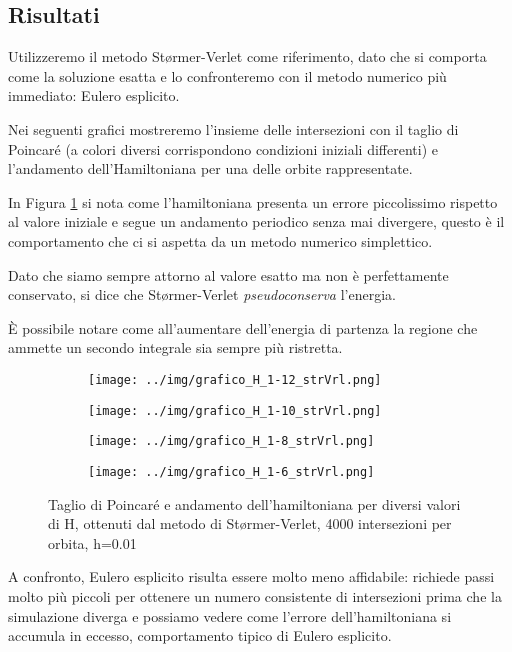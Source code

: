\documentclass[a4paper]{article}
\numberwithin{equation}{section}
\numberwithin{figure}{section}
\begin{document}
\subsection{Risultati}
Utilizzeremo il metodo Størmer-Verlet come riferimento, dato che si comporta come la soluzione
esatta\cite{hairer} e lo confronteremo con il metodo numerico più immediato: Eulero esplicito.

Nei seguenti grafici mostreremo l'insieme delle intersezioni con il taglio di Poincaré (a colori
diversi corrispondono condizioni iniziali differenti) e l'andamento dell'Hamiltoniana per una delle
orbite rappresentate.

In Figura \ref{img:stormerverlet} si nota come l'hamiltoniana presenta un errore piccolissimo rispetto
al valore iniziale e segue un andamento periodico senza mai divergere, questo è il comportamento che 
ci si aspetta da un metodo numerico simplettico.

Dato che siamo sempre attorno al valore esatto ma non è perfettamente conservato, si dice che
Størmer-Verlet \textit{pseudoconserva} l'energia.

È possibile notare come all'aumentare dell'energia di partenza la regione che ammette un secondo
integrale sia sempre più ristretta.
\clearpage
\begin{figure}[h!]
	\centering
	\begin{subfigure}[t]{.49\textwidth}
		\centering
		\texttt{[image: ../img/grafico\_H\_1-12\_strVrl.png]}
	\end{subfigure}
	\begin{subfigure}[t]{.49\textwidth}
		\centering
		\texttt{[image: ../img/grafico\_H\_1-10\_strVrl.png]}
	\end{subfigure}
	\begin{subfigure}[t]{.49\textwidth}
		\centering
		\texttt{[image: ../img/grafico\_H\_1-8\_strVrl.png]}
	\end{subfigure}
	\begin{subfigure}[t]{.49\textwidth}
		\centering
		\texttt{[image: ../img/grafico\_H\_1-6\_strVrl.png]}
	\end{subfigure}

	\caption{Taglio di Poincaré e andamento dell'hamiltoniana per diversi valori di H,
	ottenuti dal metodo di Størmer-Verlet, 4000 intersezioni per orbita, h=0.01}
	\label{img:stormerverlet}
\end{figure}

A confronto, Eulero esplicito risulta essere molto meno affidabile: richiede passi molto più
piccoli per ottenere un numero consistente di intersezioni prima che la simulazione diverga
e possiamo vedere come l'errore dell'hamiltoniana si accumula in eccesso, comportamento tipico
di Eulero esplicito.
\end{document}
